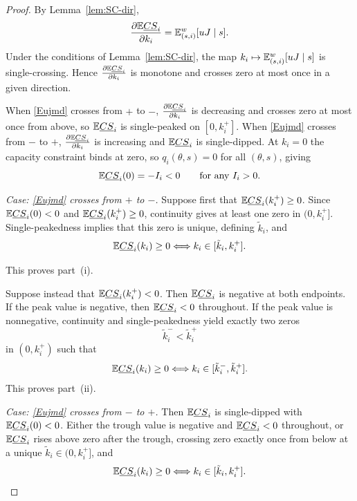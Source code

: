 \documentclass[master.tex]{subfiles}
\begin{document}
\begin{proof}

By Lemma~\ref{lem:SC-dir},
\[
\frac{\partial \mathbb{E}\underline{CS}_i}{\partial k_i}
=
\mathbb{E}_{(s,i)}^w[uJ\mid s].
\]
Under the conditions of Lemma~\ref{lem:SC-dir}, the map $k_i\mapsto \mathbb{E}_{(s,i)}^w[uJ\mid s]$ is single-crossing. Hence $\frac{\partial \mathbb{E}\underline{CS}_i}{\partial k_i}$ is monotone and crosses zero at most once in a given direction.

When \eqref{Eujmd} crosses from $+$ to $-$, $\frac{\partial \mathbb{E}\underline{CS}_i}{\partial k_i}$ is decreasing and crosses zero at most once from above, so $\mathbb{E}\underline{CS}_i$ is single-peaked on $[0,k_i^+]$. When \eqref{Eujmd} crosses from $-$ to $+$, $\frac{\partial \mathbb{E}\underline{CS}_i}{\partial k_i}$ is increasing and $\mathbb{E}\underline{CS}_i$ is single-dipped. At $k_i=0$ the capacity constraint binds at zero, so $q_i(\theta,s)=0$ for all $(\theta,s)$, giving
\[
\mathbb{E}\underline{CS}_i(0)=-I_i<0
\qquad
\text{for any }I_i>0.
\]

\noindent\textit{Case: \eqref{Eujmd} crosses from $+$ to $-$.}
Suppose first that $\mathbb{E}\underline{CS}_i(k_i^+)\ge 0$. Since $\mathbb{E}\underline{CS}_i(0)<0$ and $\mathbb{E}\underline{CS}_i(k_i^+)\ge 0$, continuity gives at least one zero in $(0,k_i^+]$. Single-peakedness implies that this zero is unique, defining $\tilde k_i$, and
\[
\mathbb{E}\underline{CS}_i(k_i)\ge 0
\Longleftrightarrow
k_i\in[\tilde k_i,k_i^+].
\]

This proves part~(i).

Suppose instead that $\mathbb{E}\underline{CS}_i(k_i^+)<0$. Then $\mathbb{E}\underline{CS}_i$ is negative at both endpoints. If the peak value is negative, then $\mathbb{E}\underline{CS}_i<0$ throughout. If the peak value is nonnegative, continuity and single-peakedness yield exactly two zeros
\[
\tilde k_i^-<\tilde k_i^+
\]
in $(0,k_i^+)$ such that
\[
\mathbb{E}\underline{CS}_i(k_i)\ge 0
\Longleftrightarrow
k_i\in[\tilde k_i^-,\tilde k_i^+].
\]
This proves part~(ii).

\noindent\textit{Case: \eqref{Eujmd} crosses from $-$ to $+$.}
Then $\mathbb{E}\underline{CS}_i$ is single-dipped with $\mathbb{E}\underline{CS}_i(0)<0$. Either the trough value is negative and $\mathbb{E}\underline{CS}_i<0$ throughout, or $\mathbb{E}\underline{CS}_i$ rises above zero after the trough, crossing zero exactly once from below at a unique $\tilde k_i\in(0,k_i^+]$, and
\[
\mathbb{E}\underline{CS}_i(k_i)\ge 0
\Longleftrightarrow
k_i\in[\tilde k_i,k_i^+].
\]
\end{proof}
\end{document}
